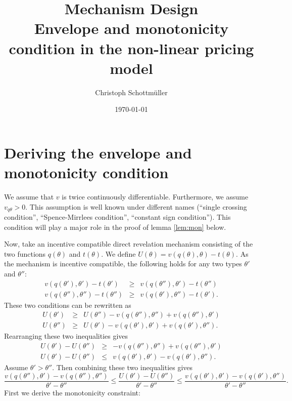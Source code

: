 \documentclass[12pt]{article}
\title{ Mechanism Design\\\large{Envelope and monotonicity condition in the non-linear pricing model}}
\author{Christoph Schottmüller}
\date{\today}
\begin{document}
\maketitle


\section{Deriving the envelope and monotonicity condition}

We assume that $v$ is twice continuously differentiable. Furthermore, we assume $v_{q\theta }>0$. This assumption is well known under different names (``single crossing condition'', ``Spence-Mirrlees condition'', ``constant sign condition''). This condition will play a major role in the proof of lemma \ref{lem:mon} below.

Now, take an incentive compatible direct revelation mechanism consisting of the two functions $q(\theta )$ and $t(\theta )$. We define $U(\theta )=v(q(\theta ),\theta )-t(\theta )$. As the mechanism is incentive compatible, the following holds for any two types $\theta '$ and $\theta ''$:
\begin{eqnarray*}
  v(q(\theta' ),\theta' )-t(\theta' )&\geq&v(q(\theta'' ),\theta' )-t(\theta'' )\\
v(q(\theta'' ),\theta'' )-t(\theta'' )&\geq&v(q(\theta' ),\theta'' )-t(\theta' ).
\end{eqnarray*}
These two conditions can be rewritten as 
\begin{eqnarray*}
  U(\theta ')&\geq&U(\theta '') -v(q(\theta ''),\theta '')+v(q(\theta ''),\theta ')\\
U(\theta'' )&\geq&U(\theta ') -v(q(\theta '),\theta ')+v(q(\theta '),\theta '').
\end{eqnarray*}
Rearranging these two inequalities gives 
\begin{eqnarray*}
  U(\theta ')-U(\theta '')&\geq& -v(q(\theta ''),\theta '')+v(q(\theta ''),\theta ')\\
U(\theta ')-U(\theta'' )&\leq& v(q(\theta '),\theta ')-v(q(\theta '),\theta '').
\end{eqnarray*}
Assume $\theta '>\theta ''$. Then combining these two inequalities gives
\begin{equation}
  \label{eq:1}
 \frac{ v(q(\theta ''),\theta ')-v(q(\theta ''),\theta '')}{\theta '-\theta ''} \leq \frac{ U(\theta ')-U(\theta '')}{\theta '-\theta ''}\leq \frac{ v(q(\theta '),\theta ')-v(q(\theta '),\theta '')}{\theta '-\theta ''}.
\end{equation}
First we derive the monotonicity constraint: 
\end{document}

